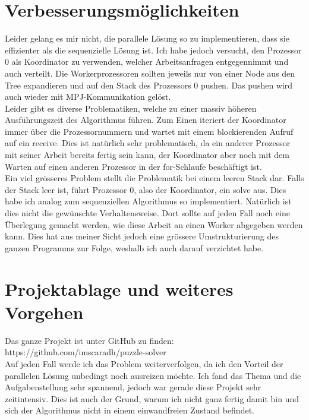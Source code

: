 \documentclass[10pt]{article}         %
\begin{document}
\section{Verbesserungsmöglichkeiten}
Leider gelang es mir nicht, die parallele Lösung so zu implementieren, dass sie effizienter als die sequenzielle Lösung ist. Ich habe jedoch versucht, den Prozessor 0 als Koordinator zu verwenden, welcher Arbeitsanfragen entgegennimmt und auch verteilt. Die Workerprozessoren sollten jeweils nur von einer Node aus den Tree expandieren und auf den Stack des Prozessors 0 pushen. Das pushen wird auch wieder mit MPJ-Kommunikation gelöst. \\
Leider gibt es diverse Problematiken, welche zu einer massiv höheren Ausführungszeit des Algorithmus führen. Zum Einen iteriert der Koordinator immer über die Prozessornummern und wartet mit einem blockierenden Aufruf auf ein receive. Dies ist natürlich sehr problematisch, da ein anderer Prozessor mit seiner Arbeit bereits fertig sein kann, der Koordinator aber noch mit dem Warten auf einen anderen Prozessor in der for-Schlaufe beschäftigt ist. \\
Ein viel grösseres Problem stellt die Problematik bei einem leeren Stack dar. Falls der Stack leer ist, führt Prozessor 0, also der Koordinator, ein solve aus. Dies habe ich analog zum sequenziellen Algorithmus so implementiert. Natürlich ist dies nicht die gewünschte Verhaltensweise. Dort sollte auf jeden Fall noch eine Überlegung gemacht werden, wie diese Arbeit an einen Worker abgegeben werden kann. Dies hat aus meiner Sicht jedoch eine grössere Umstrukturierung des ganzen Programms zur Folge, weshalb ich auch darauf verzichtet habe.

\section{Projektablage und weiteres Vorgehen}
Das ganze Projekt ist unter GitHub zu finden: \\
https://github.com/imscaradh/puzzle-solver \\

Auf jeden Fall werde ich das Problem weiterverfolgen, da ich den Vorteil der parallelen Lösung unbedingt noch ausreizen möchte. Ich fand das Thema und die Aufgabenstellung sehr spannend, jedoch war gerade diese Projekt sehr zeitintensiv. Dies ist auch der Grund, warum ich nicht ganz fertig damit bin und sich der Algorithmus nicht in einem einwandfreien Zustand befindet. 
\end{document}

